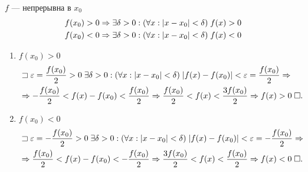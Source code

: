 \documentclass{article}
\begin{document}

\theorem

$f$ --- непрерывна в $x_0$
\begin{align*}
	 & f(x_0)>0\Rightarrow\exists\delta>0:(\forall x:|x-x_0|<\delta)\;f(x)>0 \\
	 & f(x_0)<0\Rightarrow\exists\delta>0:(\forall x:|x-x_0|<\delta)\;f(x)<0
\end{align*}

\proof

\begin{enumerate}
	\item{}$f(x_0)>0$
	\begin{align*}
		 & \sqsupset\varepsilon=\frac{f(x_0)}{2}>0\;\exists\delta>0:(\forall x:|x-x_0|<\delta)\;|f(x)-f(x_0)|<\varepsilon=\frac{f(x_0)}{2}\Rightarrow \\
		 & \Rightarrow -\frac{f(x_0)}{2}<f(x)-f(x_0)<\frac{f(x_0)}{2}\Rightarrow \frac{f(x_0)}{2}<f(x)<\frac{3f(x_0)}{2}\Rightarrow f(x)>0\;\square.
	\end{align*}
	\item{}$f(x_0)<0$
	\begin{align*}
		 & \sqsupset\varepsilon=-\frac{f(x_0)}{2}>0\;\exists\delta>0:(\forall x:|x-x_0|<\delta)\;|f(x)-f(x_0)|<\varepsilon=-\frac{f(x_0)}{2}\Rightarrow \\
		 & \Rightarrow \frac{f(x_0)}{2}<f(x)-f(x_0)<-\frac{f(x_0)}{2}\Rightarrow \frac{3f(x_0)}{2}<f(x)<\frac{f(x_0)}{2}\Rightarrow f(x)<0\;\square.
	\end{align*}
\end{enumerate}
\end{document}
